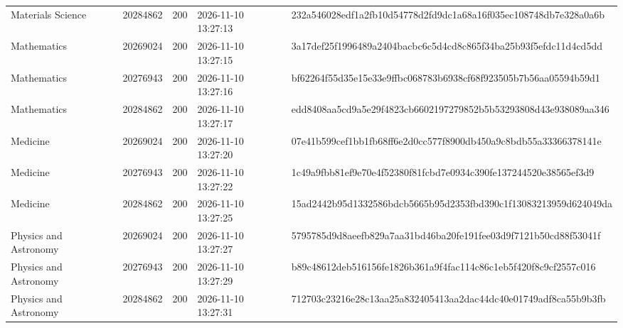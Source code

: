 \begin{tabular}{lrrll}
Materials Science & 20284862 & 200 & 2026-11-10 13:27:13 & 232a546028edf1a2fb10d54778d2fd9dc1a68a16f035ec108748db7e328a0a6b \\
Mathematics & 20269024 & 200 & 2026-11-10 13:27:15 & 3a17def25f1996489a2404bacbc6c5d4cd8c865f34ba25b93f5efdc11d4cd5dd \\
Mathematics & 20276943 & 200 & 2026-11-10 13:27:16 & bf62264f55d35e15e33e9ffbc068783b6938cf68f923505b7b56aa05594b59d1 \\
Mathematics & 20284862 & 200 & 2026-11-10 13:27:17 & edd8408aa5cd9a5e29f4823cb6602197279852b5b53293808d43e938089aa346 \\
Medicine & 20269024 & 200 & 2026-11-10 13:27:20 & 07e41b599cef1bb1fb68ff6e2d0cc577f8900db450a9c8bdb55a33366378141e \\
Medicine & 20276943 & 200 & 2026-11-10 13:27:22 & 1c49a9fbb81ef9e70e4f52380f81fcbd7e0934c390fe137244520e38565ef3d9 \\
Medicine & 20284862 & 200 & 2026-11-10 13:27:25 & 15ad2442b95d1332586bdcb5665b95d2353fbd390c1f13083213959d624049da \\
Physics and Astronomy & 20269024 & 200 & 2026-11-10 13:27:27 & 5795785d9d8aeefb829a7aa31bd46ba20fe191fee03d9f7121b50cd88f53041f \\
Physics and Astronomy & 20276943 & 200 & 2026-11-10 13:27:29 & b89c48612deb516156fe1826b361a9f4fac114c86c1eb5f420f8c9cf2557c016 \\
Physics and Astronomy & 20284862 & 200 & 2026-11-10 13:27:31 & 712703c23216e28c13aa25a832405413aa2dac44dc40e01749adf8ca55b9b3fb \\
\bottomrule
\end{tabular}
